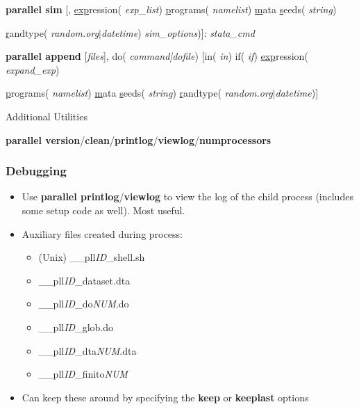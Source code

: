 \documentclass[9pt,\ExtraDocOpts]{beamer}
\begin{document}
\begin{frame}
\begin{semiverbatim}
	\footnotesize
	{\bf parallel sim} [, \uline{exp}ression(\textit{\color{blue} exp\_list}) \uline{p}rograms(\textit{\color{blue} namelist}) \uline{m}ata \uline{s}eeds(\textit{\color{blue} string})
	
	\hspace{1cm} \uline{r}andtype(\textit{\color{blue} random.org$|$datetime}) \textit{sim\_options})]:  \textit{stata\_cmd}
\end{semiverbatim}\pause{}

\begin{semiverbatim}
	\footnotesize
	{\bf parallel append} [\textit{files}], do(\textit{\color{blue} command|dofile}) [in(\textit{\color{blue} in}) if(\textit{\color{blue} if}) \uline{exp}ression(\textit{\color{blue} expand\_exp})
	
	\hspace{1cm} \uline{p}rograms(\textit{\color{blue} namelist}) \uline{m}ata \uline{s}eeds(\textit{\color{blue} string}) \uline{r}andtype(\textit{\color{blue} random.org$|$datetime})]
\end{semiverbatim}\pause{}

Additional Utilities
\begin{semiverbatim}
	\footnotesize
	{\bf parallel version}/{\bf clean}/{\bf printlog}/{\bf viewlog}/{\bf numprocessors}
\end{semiverbatim}

\end{frame}

\begin{frame}
\frametitle{Debugging }
\begin{itemize}
\item Use {\bf parallel printlog}/{\bf viewlog} to view the log of the child process (includes some setup code as well). Most useful.\pause{}
\item Auxiliary files created during process:\pause{}
\begin{itemize}
\item (Unix) \_\_pll\textit{ID}\_shell.sh
\item \_\_pll\textit{ID}\_dataset.dta
\item \_\_pll\textit{ID}\_do\textit{NUM}.do
\item \_\_pll\textit{ID}\_glob.do
\item \_\_pll\textit{ID}\_dta\textit{NUM}.dta
\item \_\_pll\textit{ID}\_finito\textit{NUM}\pause{}
\end{itemize}
\item Can keep these around by specifying the {\bf keep} or {\bf keeplast} options 
\end{itemize}
\end{frame}
\end{document}

